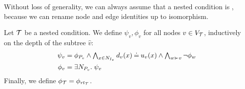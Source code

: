 Without loss of generality, we can always assume that a nested condition is \proper, because we can rename node and edge identities up to isomorphism.

%
%
Let ${\mathcal{T}}$ be a \proper nested condition. We define $\psi_v,\phi_v$ for all nodes $v\in V_{\mathcal{T}}$, inductively on the depth of the subtree $\hat v$:
%
\begin{align}
\psi_v = {} & \textstyle \phi_{P_v}\wedge \bigwedge_{x\in N_{I_v}} d_v(x)\Eq u_v(x) \wedge \bigwedge_{w\childof v} \neg\phi_w \label{eq:psi} \\
\phi_v = {} & \exists N_{P_v}\st \psi_v\label{eq:phi} 
\end{align}
%
Finally, we define $\phi_{\mathcal{T}}=\phi_{\mathit{rt}_{{\mathcal{T}}}}$.
%


